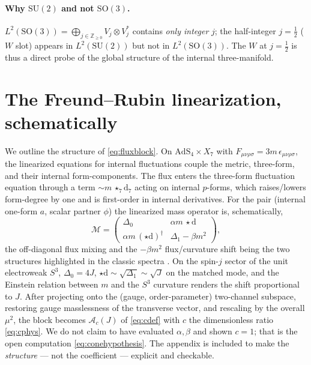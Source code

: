 \documentclass[11pt]{article}
\theoremstyle{plain}
\theoremstyle{definition}
\newcommand{\cA}{\mathcal{A}}
\newcommand{\cM}{\mathcal{M}}
\newcommand{\half}{\tfrac12}
\newcommand{\dd}{\mathrm{d}}
\newcommand{\Z}{\mathbb{Z}}
\newcommand{\SU}{\mathrm{SU}}
\newcommand{\SO}{\mathrm{SO}}
\newcommand{\AdS}{\mathrm{AdS}}
\begin{document}
\paragraph{Why $\SU(2)$ and not $\SO(3)$.} $L^2(\SO(3))=\bigoplus_{j\in\Z_{\ge0}}V_j\otimes V_j^*$
contains \emph{only integer} $j$; the half-integer $j=\half$ ($W$ slot)
appears in $L^2(\SU(2))$ but not in $L^2(\SO(3))$. The $W$ at $j=\half$ is
thus a direct probe of the global structure of the internal three-manifold.

\section{The Freund--Rubin linearization, schematically}
\label{app:flux}

We outline the structure of \eqref{eq:fluxblock}. On $\AdS_4\times X_7$ with
$F_{\mu\nu\rho\sigma}=3m\,\epsilon_{\mu\nu\rho\sigma}$, the linearized
equations for internal fluctuations couple the metric, three-form, and
their internal form-components. The flux enters the three-form fluctuation
equation through a term $\sim m\,\star_7\dd_7$ acting on internal $p$-forms,
which raises/lowers form-degree by one and is first-order in internal
derivatives. For the pair (internal one-form $a$, scalar partner $\phi$)
the linearized mass operator is, schematically,
\begin{equation}
\cM=
\begin{pmatrix}
\Delta_0 & \alpha m\,\star\dd\\
\alpha m\,(\star\dd)^\dagger & \Delta_1-\beta m^2
\end{pmatrix},
\end{equation}
the off-diagonal flux mixing and the $-\beta m^2$ flux/curvature shift being
the two structures highlighted in the classic spectra
\cite{CasherEnglertNicolaiRooman1984,Englert1982,DuffNilssonPope1986}. On
the spin-$j$ sector of the unit electroweak $S^3$, $\Delta_0=4J$,
$\star\dd\sim\sqrt{\Delta_1}\sim\sqrt J$ on the matched mode, and the Einstein
relation between $m$ and the $S^3$ curvature renders the shift proportional
to $J$. After projecting onto the (gauge, order-parameter) two-channel
subspace, restoring gauge masslessness of the transverse vector, and
rescaling by the overall $\mu^2$, the block becomes $\cA_c(J)$ of
\eqref{eq:cdef} with $c$ the dimensionless ratio \eqref{eq:cphys}. We do not
claim to have evaluated $\alpha,\beta$ and shown $c=1$; that is the open
computation \eqref{eq:conehypothesis}. The appendix is included to make the
\emph{structure} --- not the coefficient --- explicit and checkable.
\end{document}
